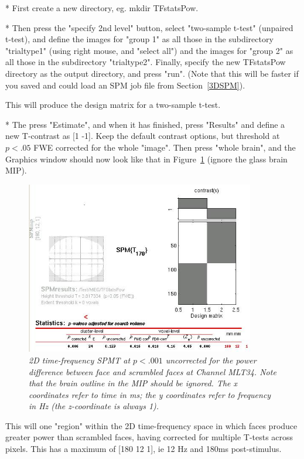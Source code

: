 * First create a new directory, eg. mkdir TFstatsPow.

* Then press the "specify 2nd level" button,  select "two-sample t-test" (unpaired t-test), and define the images for "group 1" as all those in the subdirectory "trialtype1" (using right mouse, and "select all") and the images for "group 2" as all those in the subdirectory "trialtype2". Finally, specify the new TFstatsPow directory as the output directory, and press "run". (Note that this will be faster if you saved and could load an SPM job file from Section~\ref{3DSPM}).

This will produce the design matrix for a two-sample t-test.

* The press "Estimate", and when it has finished, press "Results" and define a new T-contrast as [1 -1]. Keep the default contrast options, but threshold at $p<.05$ FWE corrected for the whole "image". Then press "whole brain", and the Graphics window should now look like that in Figure~\ref{fig_32_16} (ignore the glass brain MIP).


\begin{figure}
\begin{center}
\includegraphics[width=100mm]{multimodal/figures/figure_32_16}
\caption{\em  2D time-frequency SPM{T} at $p<.001$ uncorrected for the power difference between face and scrambled faces at Channel MLT34. Note that the brain outline in the MIP should be ignored. The x  coordinates refer to time in ms; the y coordinates refer to frequency in Hz (the z-coordinate is always 1).\label{fig_32_16}}
\end{center}
\end{figure}

This will one "region" within the 2D time-frequency space in which faces produce greater power than scrambled faces, having corrected for multiple T-tests across pixels. This has a maximum of  [180 12 1], ie 12 Hz and 180ms post-stimulus.

